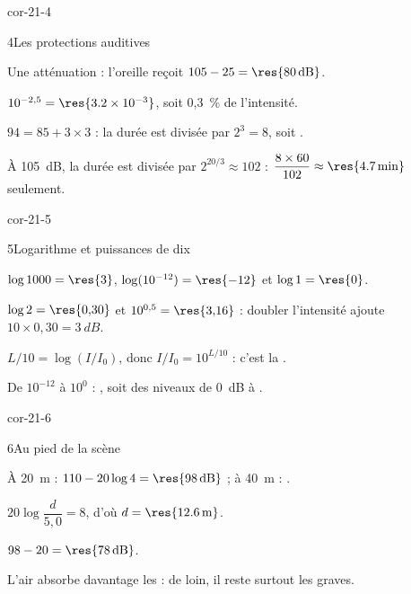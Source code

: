 \begin{blocLivre}{cor-21-4}
\begin{corrige}{4}{Les protections auditives}
\begin{questions}
\item Une atténuation  : l'oreille reçoit $105-25=\res{\qty{80}{dB}}$.
\item $10^{-2{,}5}=\res{\num{3.2e-3}}$, soit 0,3~\% de l'intensité.
\item $94=85+3\times3$ : la durée est divisée par $2^3=8$, soit .
\item À \qty{105}{dB}, la durée est divisée par $2^{20/3}\approx102$ : $\dfrac{8\times60}{102}\approx\res{\qty{4,7}{min}}$ seulement.
\end{questions}
\end{corrige}
\end{blocLivre}
\begin{blocLivre}{cor-21-5}
\begin{corrige}{5}{Logarithme et puissances de dix}
\begin{questions}
\item $\log1000=\res{3}$, $\log(10^{-12})=\res{-12}$ et $\log1=\res{0}$.
\item $\log2=\res{0{,}30}$ et $10^{0{,}5}=\res{3{,}16}$ : doubler l'intensité ajoute $10\times0{,}30=\qty{3}{dB}$.
\item $L/10=\log(I/I_0)$, donc $I/I_0=10^{L/10}$ : c'est la .
\item De $10^{-12}$ à $10^{0}$ : , soit des niveaux de \qty{0}{dB} à .
\end{questions}
\end{corrige}
\end{blocLivre}
\begin{blocLivre}{cor-21-6}
\begin{corrige}{6}{Au pied de la scène}
\begin{questions}
\item À \qty{20}{m} : $110-20\log4=\res{\qty{98}{dB}}$ ; à \qty{40}{m} : .
\item $20\log\dfrac{d}{5{,}0}=8$, d'où $d=\res{\qty{12,6}{m}}$.
\item $98-20=\res{\qty{78}{dB}}$.
\item L'air absorbe davantage les  : de loin, il reste surtout les graves.
\end{questions}
\end{corrige}
\end{blocLivre}
